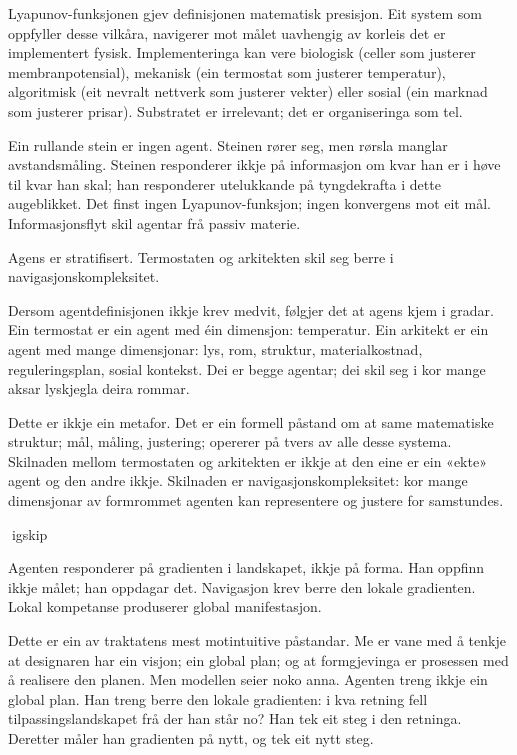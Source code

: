 Lyapunov-funksjonen gjev definisjonen matematisk presisjon. Eit system som oppfyller desse vilkåra, navigerer mot målet uavhengig av korleis det er implementert fysisk. Implementeringa kan vere biologisk (celler som justerer membranpotensial), mekanisk (ein termostat som justerer temperatur), algoritmisk (eit nevralt nettverk som justerer vekter) eller sosial (ein marknad som justerer prisar). Substratet er irrelevant; det er organiseringa som tel.

Ein rullande stein er ingen agent. Steinen rører seg, men rørsla manglar avstandsmåling. Steinen responderer ikkje på informasjon om kvar han er i høve til kvar han skal; han responderer utelukkande på tyngdekrafta i dette augeblikket. Det finst ingen Lyapunov-funksjon; ingen konvergens mot eit mål. Informasjonsflyt skil agentar frå passiv materie.

Agens er stratifisert. Termostaten og arkitekten skil seg berre i navigasjonskompleksitet.

Dersom agentdefinisjonen ikkje krev medvit, følgjer det at agens kjem i gradar. Ein termostat er ein agent med éin dimensjon: temperatur. Ein arkitekt er ein agent med mange dimensjonar: lys, rom, struktur, materialkostnad, reguleringsplan, sosial kontekst. Dei er begge agentar; dei skil seg i kor mange aksar lyskjegla deira rommar.

Dette er ikkje ein metafor. Det er ein formell påstand om at same matematiske struktur; mål, måling, justering; opererer på tvers av alle desse systema. Skilnaden mellom termostaten og arkitekten er ikkje at den eine er ein «ekte» agent og den andre ikkje. Skilnaden er navigasjonskompleksitet: kor mange dimensjonar av formrommet agenten kan representere og justere for samstundes.

igskip

Agenten responderer på gradienten i landskapet, ikkje på forma. Han oppfinn ikkje målet; han oppdagar det. Navigasjon krev berre den lokale gradienten. Lokal kompetanse produserer global manifestasjon.

Dette er ein av traktatens mest motintuitive påstandar. Me er vane med å tenkje at designaren har ein visjon; ein global plan; og at formgjevinga er prosessen med å realisere den planen. Men modellen seier noko anna. Agenten treng ikkje ein global plan. Han treng berre den lokale gradienten: i kva retning fell tilpassingslandskapet frå der han står no? Han tek eit steg i den retninga. Deretter måler han gradienten på nytt, og tek eit nytt steg.


